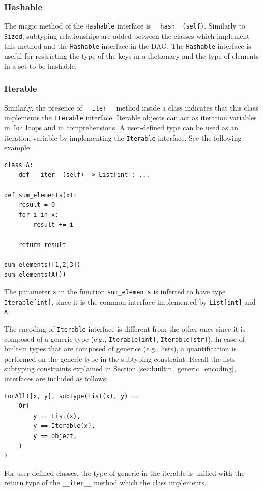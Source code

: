 \subsubsection{Hashable}
The magic method of the \lstinline|Hashable| interface is \lstinline|__hash__(self)|. Similarly to \lstinline|Sized|, subtyping relationships are added between the classes which implement this method and the \lstinline|Hashable| interface in the DAG. The \lstinline|Hashable| interface is useful for restricting the type of the keys in a dictionary and the type of elements in a set to be hashable.

\subsubsection{Iterable}
Similarly, the presence of \lstinline|__iter__| method inside a class indicates that this class implements the \lstinline|Iterable| interface. Iterable objects can act as iteration variables in \lstinline|for| loops and in comprehensions. A user-defined type can be used as an iteration variable by implementing the \lstinline|Iterable| interface. See the following example:
\begin{lstlisting}
class A:
	def __iter__(self) -> List[int]: ...

def sum_elements(x):
	result = 0
	for i in x:
		result += i
	
	return result
	
sum_elements([1,2,3])
sum_elements(A())
\end{lstlisting}
The parameter \lstinline|x| in the function \lstinline|sum_elements| is inferred to have type \lstinline|Iterable[int]|, since it is the common interface implemented by \lstinline|List[int]| and \lstinline|A|.

The encoding of \lstinline|Iterable| interface is different from the other ones since it is composed of a generic type (e.g., \lstinline|Iterable[int]|, \lstinline|Iterable[str]|). In case of built-in types that are composed of generics (e.g., lists), a quantification is performed on the generic type in the subtyping constraint. Recall the lists subtyping constraints explained in Section \ref{sec:builtin_generic_encoding}, interfaces are included as follows:
\begin{lstlisting}
ForAll([x, y], subtype(List(x), y) ==
	Or(
		y == List(x),
		y == Iterable(x),
		y == object,
	)
)
\end{lstlisting}
For user-defined classes, the type of generic in the iterable is unified with the return type of the \lstinline|__iter__| method which the class implements.

